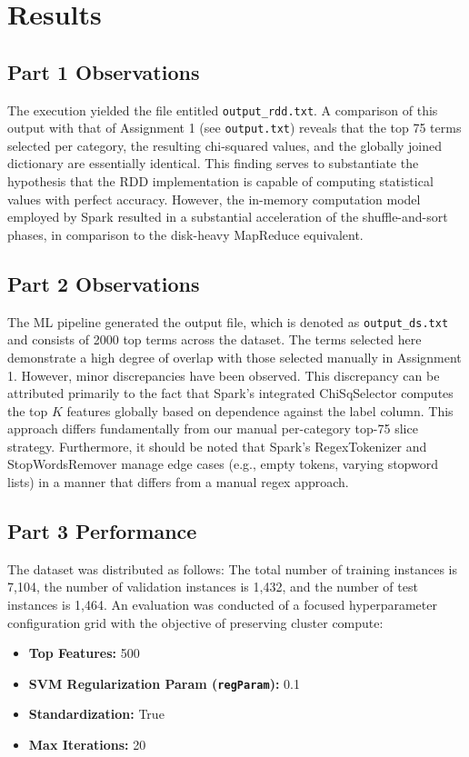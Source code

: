 \documentclass[11pt,a4paper]{article}
\begin{document}
\section{Results}

\subsection{Part 1 Observations}

The execution yielded the file entitled \texttt{output\_rdd.txt}. A comparison of this output with that of Assignment 1 (see \texttt{output.txt}) reveals that the top 75 terms selected per category, the resulting chi-squared values, and the globally joined dictionary are essentially identical. This finding serves to substantiate the hypothesis that the RDD implementation is capable of computing statistical values with perfect accuracy. However, the in-memory computation model employed by Spark resulted in a substantial acceleration of the shuffle-and-sort phases, in comparison to the disk-heavy MapReduce equivalent.

\subsection{Part 2 Observations}
The ML pipeline generated the output file, which is denoted as \texttt{output\_ds.txt} and consists of 2000 top terms across the dataset. The terms selected here demonstrate a high degree of overlap with those selected manually in Assignment 1. However, minor discrepancies have been observed. This discrepancy can be attributed primarily to the fact that Spark's integrated ChiSqSelector computes the top $K$ features globally based on dependence against the label column. This approach differs fundamentally from our manual per-category top-75 slice strategy. Furthermore, it should be noted that Spark's RegexTokenizer and StopWordsRemover manage edge cases (e.g., empty tokens, varying stopword lists) in a manner that differs from a manual regex approach.

\subsection{Part 3 Performance}
The dataset was distributed as follows: The total number of training instances is 7,104, the number of validation instances is 1,432, and the number of test instances is 1,464. An evaluation was conducted of a focused hyperparameter configuration grid with the objective of preserving cluster compute:
\begin{itemize}
    \item \textbf{Top Features:} 500
    \item \textbf{SVM Regularization Param (\texttt{regParam}):} 0.1
    \item \textbf{Standardization:} True
    \item \textbf{Max Iterations:} 20
\end{itemize}
\end{document}

